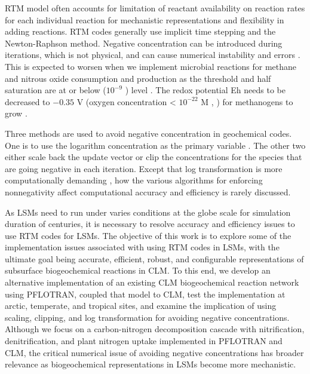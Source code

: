 \documentclass[gmd, manuscript]{copernicus}
\begin{document}
RTM model often accounts for limitation of reactant availability on reaction rates for each individual reaction for mechanistic representations and flexibility in adding reactions. RTM codes generally use implicit time stepping and the Newton-Raphson method. Negative concentration can be introduced during iterations, which is not physical, and can cause numerical instability and errors \citep{Shampine2005}. This is expected to worsen when we implement microbial reactions for methane and nitrous oxide consumption and production as the threshold and half saturation are at or below  ($10^{-9}$ ) level \citep{Conrad1996}. The redox potential Eh needs to be decreased to $-0.35$ \unit{V} (oxygen concentration < $10^{-22}$ \unit{M} \citeauthor{Hungate1975}, \citeyear{Hungate1975}) for methanogens to grow \citep{Jarrell1985}. 

Three methods are used to avoid negative concentration in geochemical codes. One is to use the logarithm concentration as the primary variable
\citep{Bethke2007,Hammond2003,Parkhurst1999}. The other two either scale back the update vector \citep{Bethke2007,Hammond2003} or clip the concentrations for the species that are going negative \citep{Yeh2004,White2005,Xu2014} in each iteration. Except that log transformation is more computationally demanding \citep{Hammond2003}, how the various algorithms for enforcing nonnegativity affect computational accuracy and efficiency is rarely discussed. 

As LSMs need to run under varies conditions at the globe scale for simulation duration of centuries, it is necessary to resolve accuracy and efficiency
issues to use RTM codes for LSMs. The objective of this work is to explore some of the implementation issues associated with using RTM codes in LSMs, with the ultimate goal being accurate, efficient, robust, and configurable representations of subsurface biogeochemical reactions in CLM. To this end, we develop an alternative implementation of an existing CLM biogeochemical reaction network using PFLOTRAN, coupled that model to CLM, test the implementation at arctic, temperate, and
tropical sites, and examine the implication of using scaling, clipping, and log transformation for avoiding negative concentrations.  Although we focus on a carbon-nitrogen decomposition cascade with nitrification, denitrification, and plant nitrogen uptake implemented in PFLOTRAN and CLM, the critical numerical issue of avoiding negative concentrations has broader relevance as biogeochemical representations in LSMs become more mechanistic. 
\end{document}
